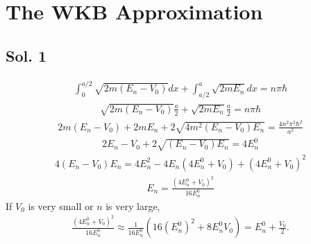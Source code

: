 \section{The WKB Approximation}
\subsection*{Sol. 1}
\begin{align*}
    \int_0^{a/2}\sqrt{2m(E_n-V_0)}dx + 
    \int_{a/2}^a\sqrt{2mE_n}dx = n\pi \hbar
\end{align*}
\begin{align*}
    \sqrt{2m(E_n-V_0)}\frac{a}{2}
    +
    \sqrt{2mE_n}\frac{a}{2}=n\pi \hbar
\end{align*}
\begin{align*}
    2m(E_n-V_0)+2mE_n
    +2\sqrt{4m^2(E_n-V_0)E_n}
    =\frac{4n^2\pi^2\hbar^2}{a^2}
\end{align*}
\begin{align*}
    2E_n-V_0
    +
    2\sqrt{(E_n-V_0)E_n}
    =4E^0_n
\end{align*}
\begin{align*}
    4(E_n-V_0)E_n = 
    4E_n^2-4E_n(4E_n^0+V_0)+(4E_n^0+V_0)^2
\end{align*}
\begin{align*}
    E_n = \frac{(4E^0_n+V_0)^2}{16 E_n^0}
\end{align*}
If $V_0$ is very small or $n$ is very large,
\begin{align*}
    \frac{(4E^0_n+V_0)^2}{16 E_n^0}\approx
    \frac{1}{16E_n^0}
    (16(E_n^0)^2+8E_n^0V_0)
    =E_n^0+\frac{V_0}{2}.
\end{align*}

